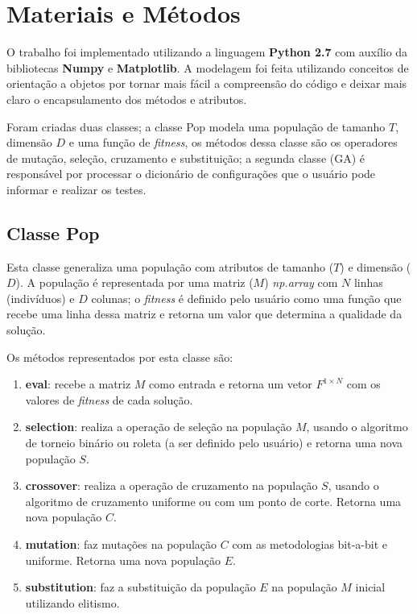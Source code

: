 \documentclass[11pt,a4paper]{article}
\begin{document}
\section{Materiais e Métodos}
O trabalho foi implementado utilizando a linguagem \textbf{Python 2.7} com auxílio da bibliotecas \textbf{Numpy} e \textbf{Matplotlib}. A modelagem foi feita utilizando conceitos de orientação a objetos por tornar mais fácil a compreensão do código e deixar mais claro o encapsulamento dos métodos e atributos.

Foram criadas duas classes; a classe Pop modela uma população de tamanho $T$, dimensão $D$ e uma função de \textit{fitness}, os métodos dessa classe são os operadores de mutação, seleção, cruzamento e substituição; a segunda classe (GA) é responsável por processar o dicionário de configurações que o usuário pode informar e realizar os testes.

\subsection{Classe Pop}
Esta classe generaliza uma população com atributos de tamanho ($T$) e dimensão ($D$). A população é representada por uma matriz ($M$) \textit{np.array} com $N$ linhas (indivíduos) e $D$ colunas; o \textit{fitness} é definido pelo usuário como uma função que recebe uma linha dessa matriz e retorna um valor que determina a qualidade da solução.

Os métodos representados por esta classe são:
\begin{enumerate}
	\item \textbf{eval}: recebe a matriz $M$ como entrada e retorna um vetor $F^{1\times N}$ com os valores de \textit{fitness} de cada solução.
	\item \textbf{selection}: realiza a operação de seleção na população $M$, usando o algoritmo de torneio binário ou roleta (a ser definido pelo usuário) e retorna uma nova população $S$.
	\item \textbf{crossover}: realiza a operação de cruzamento na população $S$, usando o algoritmo de cruzamento uniforme ou com um ponto de corte. Retorna uma nova população $C$.
	\item \textbf{mutation}: faz mutações na população $C$ com as metodologias bit-a-bit e uniforme. Retorna uma nova população $E$.
	\item \textbf{substitution}: faz a substituição da população $E$ na população $M$ inicial utilizando elitismo.
\end{enumerate}
\end{document}
